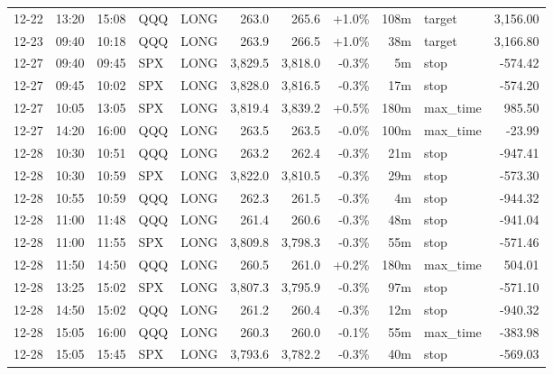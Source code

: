 \documentclass[11pt,a4paper,twoside]{article}
\begin{document}
\begin{center}
\begin{longtable}{>{\color{txtmain}}l l l l l r r r r >{\color{txtmain}}l r}
12-22 & 13:20 & 15:08 & QQQ & LONG & 263.0 & 265.6 & \textcolor{wingreen}{+1.0\%} & 108m & target & \textcolor{wingreen}{3,156.00} \\
12-23 & 09:40 & 10:18 & QQQ & LONG & 263.9 & 266.5 & \textcolor{wingreen}{+1.0\%} & 38m & target & \textcolor{wingreen}{3,166.80} \\
12-27 & 09:40 & 09:45 & SPX & LONG & 3,829.5 & 3,818.0 & \textcolor{lossred}{-0.3\%} & 5m & stop & \textcolor{lossred}{-574.42} \\
12-27 & 09:45 & 10:02 & SPX & LONG & 3,828.0 & 3,816.5 & \textcolor{lossred}{-0.3\%} & 17m & stop & \textcolor{lossred}{-574.20} \\
12-27 & 10:05 & 13:05 & SPX & LONG & 3,819.4 & 3,839.2 & \textcolor{wingreen}{+0.5\%} & 180m & max\_time & \textcolor{wingreen}{985.50} \\
12-27 & 14:20 & 16:00 & QQQ & LONG & 263.5 & 263.5 & \textcolor{lossred}{-0.0\%} & 100m & max\_time & \textcolor{lossred}{-23.99} \\
12-28 & 10:30 & 10:51 & QQQ & LONG & 263.2 & 262.4 & \textcolor{lossred}{-0.3\%} & 21m & stop & \textcolor{lossred}{-947.41} \\
12-28 & 10:30 & 10:59 & SPX & LONG & 3,822.0 & 3,810.5 & \textcolor{lossred}{-0.3\%} & 29m & stop & \textcolor{lossred}{-573.30} \\
12-28 & 10:55 & 10:59 & QQQ & LONG & 262.3 & 261.5 & \textcolor{lossred}{-0.3\%} & 4m & stop & \textcolor{lossred}{-944.32} \\
12-28 & 11:00 & 11:48 & QQQ & LONG & 261.4 & 260.6 & \textcolor{lossred}{-0.3\%} & 48m & stop & \textcolor{lossred}{-941.04} \\
12-28 & 11:00 & 11:55 & SPX & LONG & 3,809.8 & 3,798.3 & \textcolor{lossred}{-0.3\%} & 55m & stop & \textcolor{lossred}{-571.46} \\
12-28 & 11:50 & 14:50 & QQQ & LONG & 260.5 & 261.0 & \textcolor{wingreen}{+0.2\%} & 180m & max\_time & \textcolor{wingreen}{504.01} \\
12-28 & 13:25 & 15:02 & SPX & LONG & 3,807.3 & 3,795.9 & \textcolor{lossred}{-0.3\%} & 97m & stop & \textcolor{lossred}{-571.10} \\
12-28 & 14:50 & 15:02 & QQQ & LONG & 261.2 & 260.4 & \textcolor{lossred}{-0.3\%} & 12m & stop & \textcolor{lossred}{-940.32} \\
12-28 & 15:05 & 16:00 & QQQ & LONG & 260.3 & 260.0 & \textcolor{lossred}{-0.1\%} & 55m & max\_time & \textcolor{lossred}{-383.98} \\
12-28 & 15:05 & 15:45 & SPX & LONG & 3,793.6 & 3,782.2 & \textcolor{lossred}{-0.3\%} & 40m & stop & \textcolor{lossred}{-569.03} \\

\end{longtable}
\end{center}
\end{document}
